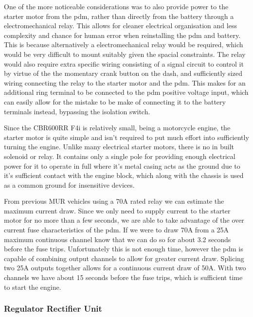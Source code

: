 One of the more noticeable considerations was to also provide power to the starter motor from the \acrshort{pdm}, rather than directly from the battery through a electromechanical relay.  This allows for cleaner electrical organisation and less complexity and chance for human error when reinstalling the \acrshort{pdm} and battery.  This is because alternatively a electromechanical relay would be required, which would be very difficult to mount suitably given the spacial constraints.  The relay would also require extra specific wiring consisting of a signal circuit to control it by virtue of the the momentary crank button on the dash, and sufficiently sized wiring connecting the relay to the starter motor and the \acrshort{pdm}. This makes for an additional ring terminal to be connected to the \acrshort{pdm} positive voltage input, which can easily allow for the mistake to be make of connecting it to the battery terminals instead, bypassing the isolation switch.

Since the CBR600RR F4i is relatively small, being a motorcycle engine, the starter motor is quite simple and isn't required to put much effort into sufficiently turning the engine.  Unlike many electrical starter motors, there is no in built solenoid or relay.  It contains only a single pole for providing enough electrical power for it to operate in full where it's metal casing acts as the ground due to it's sufficient contact with the engine block, which along with the chassis is used as a common ground for insensitive devices.

From previous MUR vehicles using a 70A rated relay we can estimate the maximum current draw.  Since we only need to supply current to the starter motor for no more than a few seconds, we are able to take advantage of the over current fuse characteristics of the \acrshort{pdm}\@.  If we were to draw 70A from a 25A maximum continuous channel know that we can do so for about 3.2 seconds before the fuse trips\?.  Unfortunately this is not enough time, however the \acrshort{pdm} is capable of combining output channels to allow for greater current draw.  Splicing two 25A outputs together allows for a continuous current draw of 50A.  With two channels we have about 15 seconds before the fuse trips, which is sufficient time to start the engine.

\subsubsection{Regulator Rectifier Unit}

